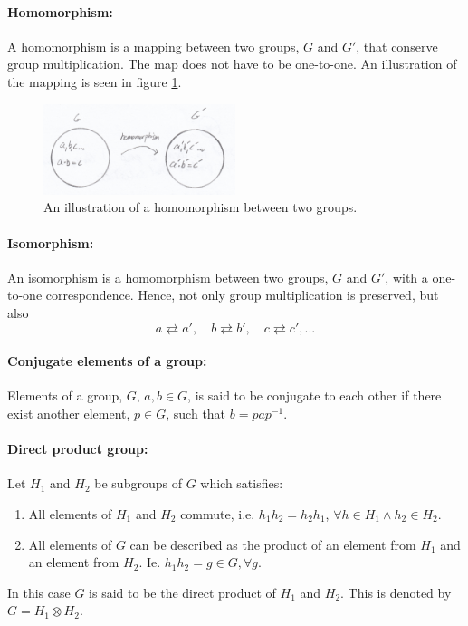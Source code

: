 \paragraph{Homomorphism: }
A homomorphism is a mapping between two groups, $G$ and $G'$, that conserve group multiplication. The map does not have to be one-to-one. An illustration of the mapping is seen in figure \ref{fig:3}.
\begin{figure}[h]
	\captionsetup{width=1\textwidth}
	\centering
	\includegraphics[width=0.5\textwidth]{figures/3}
	\caption{An illustration of a homomorphism between two groups.}
	\label{fig:3}
\end{figure}

\paragraph{Isomorphism: }
An isomorphism is a homomorphism between two groups, $G$ and $G'$, with a one-to-one correspondence. Hence, not only group multiplication is preserved, but also
\begin{equation}
	a \rightleftarrows a', \quad b \rightleftarrows b', \quad  c \rightleftarrows c',...
\end{equation}  
\paragraph{Conjugate elements of a group: }
Elements of a group, $G$, $a,b\in G$, is said to be conjugate to each other if there exist another element, $p\in G$, such that $b=pap^{-1}$.
\paragraph{Direct product group: }
Let $H_1$ and $H_2$ be subgroups of $G$ which satisfies:
\begin{enumerate}
	\item All elements of $H_1$ and $H_2$ commute, i.e. $h_1h_2=h_2h_1$, $\forall h\in H_1 \wedge h_2\in H_2$.
	\item All elements of $G$ can be described as the product of an element from $H_1$ and an element from $H_2$. Ie. $h_1h_2=g\in G, \forall g$. 
\end{enumerate}
In this case $G$ is said to be the direct product of $H_1$ and $H_2$. This is denoted by $G=H_1\otimes H_2$.
